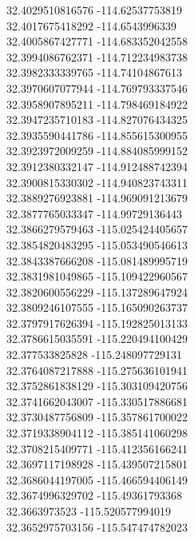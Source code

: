 {32.4029510816576	-114.62537753819\\
32.4017675418292	-114.6543996339\\
32.4005867427771	-114.683352042558\\
32.3994086762371	-114.712234983738\\
32.3982333339765	-114.74104867613\\
32.3970607077944	-114.769793337546\\
32.3958907895211	-114.798469184922\\
32.3947235710183	-114.827076434325\\
32.3935590441786	-114.855615300955\\
32.3923972009259	-114.884085999152\\
32.3912380332147	-114.912488742394\\
32.3900815330302	-114.940823743311\\
32.3889276923881	-114.969091213679\\
32.3877765033347	-114.99729136443\\
32.3866279579463	-115.025424405657\\
32.3854820483295	-115.053490546613\\
32.3843387666208	-115.081489995719\\
32.3831981049865	-115.109422960567\\
32.3820600556229	-115.137289647924\\
32.3809246107555	-115.165090263737\\
32.3797917626394	-115.192825013133\\
32.3786615035591	-115.220494100429\\
32.377533825828	-115.248097729131\\
32.3764087217888	-115.275636101941\\
32.3752861838129	-115.303109420756\\
32.3741662043007	-115.330517886681\\
32.3730487756809	-115.357861700022\\
32.3719338904112	-115.385141060298\\
32.3708215409771	-115.412356166241\\
32.3697117198928	-115.439507215801\\
32.3686044197005	-115.466594406149\\
32.3674996329702	-115.49361793368\\
32.3663973523	-115.520577994019\\
32.3652975703156	-115.547474782023\\
}
